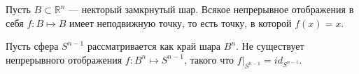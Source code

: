 \begin{to_thr}
	Пусть $B \subset \mathbb{R}^n$ --- некторый замкрнутый шар. Всякое непрерывное отображения в себя $f \colon B \mapsto B$ имеет неподвижную точку, то есть точку, в которой $f(x) = x$.
\end{to_thr}

\begin{to_thr}
	Пусть сфера $S^{n-1}$ рассматривается как край шара $B^n$. Не существует непрерывного отображения $f \colon B^n \mapsto S^{n-1}$, такого что $f |_{S^{n-1}} = id_{S^{n-1}}$.
\end{to_thr}